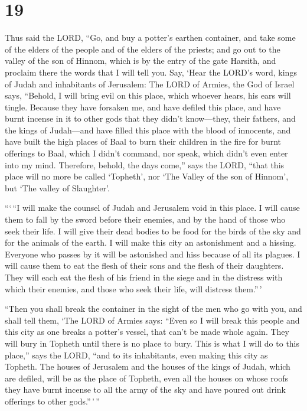 \hypertarget{section-18}{%
\section{19}\label{section-18}}

 Thus said the LORD, ``Go, and buy a potter's earthen
container, and take some of the elders of the people and of the elders
of the priests;  and go out to the valley of the son of
Hinnom, which is by the entry of the gate Harsith, and proclaim there
the words that I will tell you.  Say, `Hear the LORD's word,
kings of Judah and inhabitants of Jerusalem: The LORD of Armies, the God
of Israel says, ``Behold, I will bring evil on this place, which whoever
hears, his ears will tingle.  Because they have forsaken me,
and have defiled this place, and have burnt incense in it to other gods
that they didn't know---they, their fathers, and the kings of
Judah---and have filled this place with the blood of innocents,
 and have built the high places of Baal to burn their
children in the fire for burnt offerings to Baal, which I didn't
command, nor speak, which didn't even enter into my mind. 
Therefore, behold, the days come,'' says the LORD, ``that this place
will no more be called `Topheth', nor `The Valley of the son of Hinnom',
but `The valley of Slaughter'.

 ```\,``I will make the counsel of Judah and Jerusalem void
in this place. I will cause them to fall by the sword before their
enemies, and by the hand of those who seek their life. I will give their
dead bodies to be food for the birds of the sky and for the animals of
the earth.  I will make this city an astonishment and a
hissing. Everyone who passes by it will be astonished and hiss because
of all its plagues.  I will cause them to eat the flesh of
their sons and the flesh of their daughters. They will each eat the
flesh of his friend in the siege and in the distress with which their
enemies, and those who seek their life, will distress them.''\,'

 ``Then you shall break the container in the sight of the
men who go with you,  and shall tell them, `The LORD of
Armies says: ``Even so I will break this people and this city as one
breaks a potter's vessel, that can't be made whole again. They will bury
in Topheth until there is no place to bury.  This is what I
will do to this place,'' says the LORD, ``and to its inhabitants, even
making this city as Topheth.  The houses of Jerusalem and
the houses of the kings of Judah, which are defiled, will be as the
place of Topheth, even all the houses on whose roofs they have burnt
incense to all the army of the sky and have poured out drink offerings
to other gods.''\,'\,''

